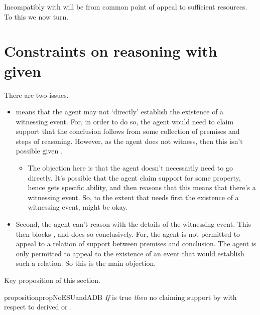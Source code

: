 \begin{note}
  Incompatibly with \ESU{} will be from common point of appeal to sufficient resources.
  To this we now turn.
\end{note}

\section{Constraints on reasoning with \gsi{} given \ESU{}}
\label{sec:incomp-wr-ura}

\begin{note}
  \color{red}
  There are two issues.
  \begin{itemize}
  \item \ESU{} means that the agent may not `directly' establish the existence of a witnessing event.
    For, in order to do so, the agent would need to claim support that the conclusion follows from some collection of premises and steps of reasoning.
    However, as the agent does not witness, then this isn't possible given \ESU{}.
    \begin{itemize}
    \item The objection here is that the agent doesn't necessarily need to go directly.
      It's possible that the agent claim support for some property, hence gets specific ability, and then reasons that this means that there's a witnessing event.
      So, to the extent that \WR{} needs first the existence of a witnessing event, \ESU{} might be okay.
    \end{itemize}
  \item Second, the agent can't reason with the details of the witnessing event.
    This then blocks \WR{}, and does so conclusively.
    For, the agent is not permitted to appeal to a relation of support between premises and conclusion.
    The agent is only permitted to appeal to the existence of an event that would establish such a relation.
    So this is the main objection.
  \end{itemize}
\end{note}

Key proposition of this section.

\begin{note}[Proposition]
    \begin{restatable}{proposition}{propNoESUandADB}\label{mcA:WR-and-denied-claim}
    \emph{If} \ESU{} is true \emph{then} no claiming support by \adB{} with respect to derived \AR{} or \WR{}.
  \end{restatable}
\end{note}

